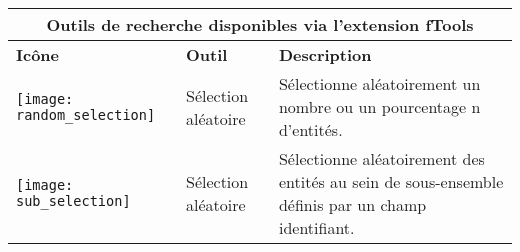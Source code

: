 \begin{table}[ht]
\centering

 \begin{tabular}{|m{1cm}|m{3cm}|m{9cm}|}
 \hline \multicolumn{3}{|c|}{\textbf{Outils de recherche disponibles via l'extension fTools}} \\ 
 \hline \textbf{Icône} & \textbf{Outil} & \textbf{Description} \\
 \hline \texttt{[image: random\_selection]} & Sélection aléatoire & Sélectionne aléatoirement un nombre ou un pourcentage n d'entités. \\
 \hline \texttt{[image: sub\_selection]} & Sélection aléatoire  & Sélectionne aléatoirement des entités au sein de sous-ensemble définis par un champ identifiant. \\

\end{tabular}
\end{table}
